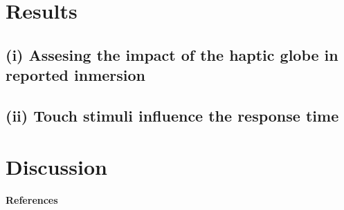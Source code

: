 \documentclass[12pt,oneside,openright]{report}
\begin{document}
\section*{Results}
    \subsection*{(i) Assesing the impact of the haptic globe in reported inmersion}

    
    \subsection*{(ii) Touch stimuli influence the response time}
\section*{Discussion}


\pagebreak


\paragraph{\textbf{References}}
\printbibliography[heading=none]
\end{document}
